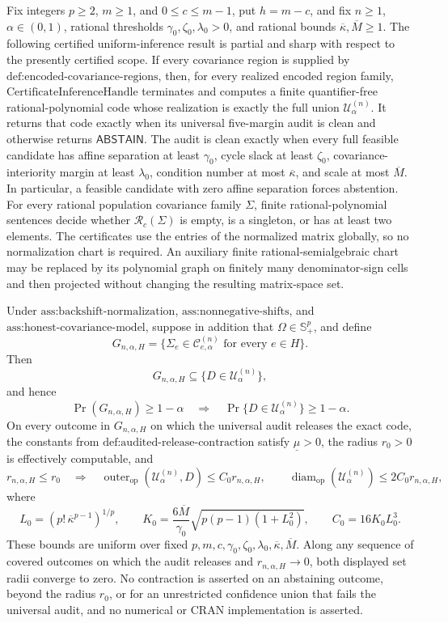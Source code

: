 Fix integers \(p\geq2\), \(m\geq1\), and \(0\leq c\leq m-1\), put \(h=m-c\), and fix \(n\geq1\), \(\alpha\in(0,1)\), rational thresholds \(\gamma_0,\zeta_0,\lambda_0>0\), and rational bounds \(\overline\kappa,\overline M\geq1\). The following certified uniform-inference result is partial and sharp with respect to the presently certified scope. If every covariance region is supplied by \(\text{def:encoded-covariance-regions}\), then, for every realized encoded region family, \(\text{CertificateInferenceHandle}\) terminates and computes a finite quantifier-free rational-polynomial code whose realization is exactly the full union \(\mathcal U^{(n)}_\alpha\). It returns that code exactly when its universal five-margin audit is clean and otherwise returns \(\mathsf{ABSTAIN}\). The audit is clean exactly when every full feasible candidate has affine separation at least \(\gamma_0\), cycle slack at least \(\zeta_0\), covariance-interiority margin at least \(\lambda_0\), condition number at most \(\overline\kappa\), and scale at most \(\overline M\). In particular, a feasible candidate with zero affine separation forces abstention. For every rational population covariance family \(\Sigma\), finite rational-polynomial sentences decide whether \(\mathcal R_c(\Sigma)\) is empty, is a singleton, or has at least two elements. The certificates use the entries of the normalized matrix globally, so no normalization chart is required. An auxiliary finite rational-semialgebraic chart may be replaced by its polynomial graph on finitely many denominator-sign cells and then projected without changing the resulting matrix-space set.

Under \(\text{ass:backshift-normalization}\), \(\text{ass:nonnegative-shifts}\), and \(\text{ass:honest-covariance-model}\), suppose in addition that \(\Omega\in\mathbb S_+^p\), and define
\[
G_{n,\alpha,H}
=\{\Sigma_e\in\mathcal C^{(n)}_{e,\alpha}\text{ for every }e\in H\}.
\]
Then
\[
G_{n,\alpha,H}\subseteq\{D\in\mathcal U^{(n)}_\alpha\},
\]
and hence
\[
\Pr(G_{n,\alpha,H})\geq1-\alpha
\quad\Longrightarrow\quad
\Pr\{D\in\mathcal U^{(n)}_\alpha\}\geq1-\alpha.
\]
On every outcome in \(G_{n,\alpha,H}\) on which the universal audit releases the exact code, the constants from \(\text{def:audited-release-contraction}\) satisfy \(\underline\mu>0\), the radius \(r_0>0\) is effectively computable, and
\[
r_{n,\alpha,H}\leq r_0
\quad\Longrightarrow\quad
\operatorname{outer}_{\mathrm{op}}(\mathcal U^{(n)}_\alpha,D)
\leq C_0r_{n,\alpha,H},
\qquad
\operatorname{diam}_{\mathrm{op}}(\mathcal U^{(n)}_\alpha)
\leq2C_0r_{n,\alpha,H},
\]
where
\[
L_0=(p!\,\overline\kappa^{p-1})^{1/p},\qquad
K_0=\frac{6\overline M}{\gamma_0}\sqrt{p(p-1)(1+L_0^2)},
\qquad
C_0=16K_0L_0^3.
\]
These bounds are uniform over fixed \(p,m,c,\gamma_0,\zeta_0,\lambda_0,\overline\kappa,\overline M\). Along any sequence of covered outcomes on which the audit releases and \(r_{n,\alpha,H}\to0\), both displayed set radii converge to zero. No contraction is asserted on an abstaining outcome, beyond the radius \(r_0\), or for an unrestricted confidence union that fails the universal audit, and no numerical or CRAN implementation is asserted.